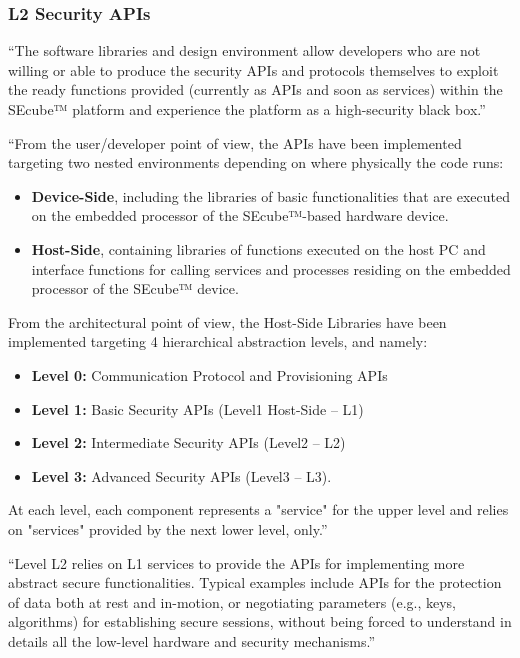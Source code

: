 \subsubsection{L2 Security APIs}

``The software libraries and design environment allow developers who are not willing or able to produce the security APIs and protocols themselves to exploit the ready functions provided (currently as APIs and soon as services) within the SEcube™ platform and experience the platform as a high-security black box.'' \cite{L2UserMan}





``From the user/developer point of view, the APIs have been implemented targeting two
nested environments depending on where physically the code runs:
\begin{itemize}
\setlength\itemsep{1pt}
\item \textbf{Device-Side}, including the libraries of basic functionalities that are executed on the embedded processor of the SEcube™-based hardware device.
\item \textbf{Host-Side}, containing libraries of functions executed on the host PC and interface functions for calling services and processes residing on the embedded processor of the SEcube™ device.
\end{itemize} 

From the architectural point of view, the Host-Side Libraries have been implemented targeting 4 hierarchical abstraction levels, and namely:
\begin{itemize}
\setlength\itemsep{-3pt}
\item \textbf{Level 0:} Communication Protocol and Provisioning APIs
\item \textbf{Level 1:} Basic Security APIs (Level1 Host-Side – L1)
\item \textbf{Level 2:} Intermediate Security APIs (Level2 – L2)
\item \textbf{Level 3:} Advanced Security APIs (Level3 – L3).
\end{itemize}

At each level, each component represents a "service" for the upper level and relies on "services" provided by the next lower level, only.'' \cite{L2UserMan}

``Level L2 relies on L1 services to provide the APIs for implementing more abstract secure functionalities. Typical examples include APIs for the protection of data both at rest and in-motion, or negotiating parameters (e.g., keys, algorithms) for establishing secure sessions, without being forced to understand in details all the low-level hardware and security mechanisms.''\cite{L2UserMan}

